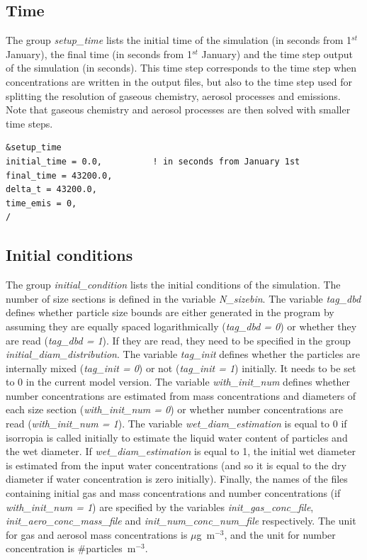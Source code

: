 \documentclass[a4paper,11pt]{article}
\begin{document}
\subsection{Time}\label{sec:time}

The group {\textit{setup\_time}} lists the initial time of the simulation (in seconds from 1$^{st}$ January), the final time (in seconds from 1$^{st}$ January) and the time step output of the simulation (in seconds). This time step corresponds to the time step when concentrations are written in the output files, but also to the time step used for splitting the resolution of gaseous chemistry, aerosol processes and emissions. Note that gaseous chemistry and aerosol processes are then solved with smaller time steps.

\begin{verbatim}
&setup_time
initial_time = 0.0,          ! in seconds from January 1st   
final_time = 43200.0,             
delta_t = 43200.0,                 
time_emis = 0,        	 
/
\end{verbatim}

\subsection{Initial conditions}
 
The group {\textit{initial\_condition}} lists the initial conditions of the simulation. The number of size sections is defined in the variable {\textit{N\_sizebin}}. The variable {\textit{tag\_dbd}} defines whether particle size bounds are either generated in the program by assuming they are equally spaced logarithmically ({\textit{tag\_dbd = 0}}) or whether they are read ({\textit{tag\_dbd = 1}}). If they are read, they need to be specified in the group {\textit{initial\_diam\_distribution}}.
The variable {\textit{tag\_init}} defines whether the particles are internally mixed ({\textit{tag\_init = 0}}) or not ({\textit{tag\_init = 1}}) initially. It needs to be set to 0 in the current model version.
The variable {\textit{with\_init\_num}} defines whether number concentrations are estimated from mass concentrations and diameters of each size section ({\textit{with\_init\_num = 0}}) or whether number concentrations are read ({\textit{with\_init\_num = 1}}).
The variable {\textit{wet\_diam\_estimation}} is equal to 0 if isorropia is called
initially to estimate the liquid water content of particles and the wet
diameter. If {\textit{wet\_diam\_estimation}} is equal to 1, the initial wet diameter is
estimated from the input water concentrations (and so it is equal to the dry
diameter if water concentration is zero initially).
Finally, the names of the files containing initial gas and mass concentrations and number concentrations (if {\textit{with\_init\_num = 1}}) are specified by the variables {\textit{init\_gas\_conc\_file}}, {\textit{init\_aero\_conc\_mass\_file}} and {\textit{init\_num\_conc\_num\_file}} respectively.
The unit for gas and aerosol mass concentrations is $\mu$g~m$^{-3}$, and the unit for number concentration is \#particles~m$^{-3}$.
\end{document}
